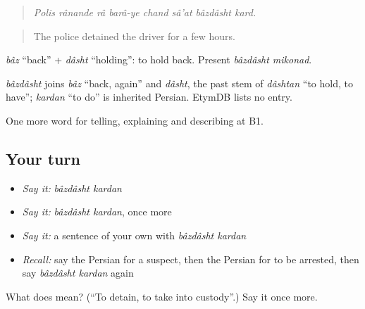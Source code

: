 \begin{quote}
\emph{Polis rânande râ barâ-ye chand sâ'at bâzdâsht kard.}
\end{quote}

\begin{quote}
The police detained the driver for a few hours.
\end{quote}

\emph{bâz} \textquotedblleft{}back\textquotedblright{} + \emph{dâsht} \textquotedblleft{}holding\textquotedblright{}: to hold back. Present \emph{bâzdâsht mikonad}.

\begin{cousinweb}
\emph{bâzdâsht} joins \emph{bâz} \textquotedblleft{}back, again\textquotedblright{} and \emph{dâsht}, the past stem of \emph{dâshtan} \textquotedblleft{}to hold, to have\textquotedblright{}; \emph{kardan} \textquotedblleft{}to do\textquotedblright{} is inherited Persian. EtymDB lists no entry.
\end{cousinweb}

\begin{grammarlens}[title={What you've built}]
One more word for telling, explaining and describing at B1.
\end{grammarlens}

\subsection*{Your turn}
\begin{itemize}
\raggedright
  \item \emph{Say it:} \emph{bâzdâsht kardan}
  \item \emph{Say it:} \emph{bâzdâsht kardan}, once more
  \item \emph{Say it:} a sentence of your own with \emph{bâzdâsht kardan}
  \item \emph{Recall:} say the Persian for a suspect, then the Persian for to be arrested, then say \emph{bâzdâsht kardan} again
\end{itemize}

\begin{tcolorbox}[breakable,colback=teal!4,colframe=teal!35!black,title={Before you move on}]
What does   mean? (\textquotedblleft{}To detain, to take into custody\textquotedblright{}.) Say it once more.
\end{tcolorbox}
